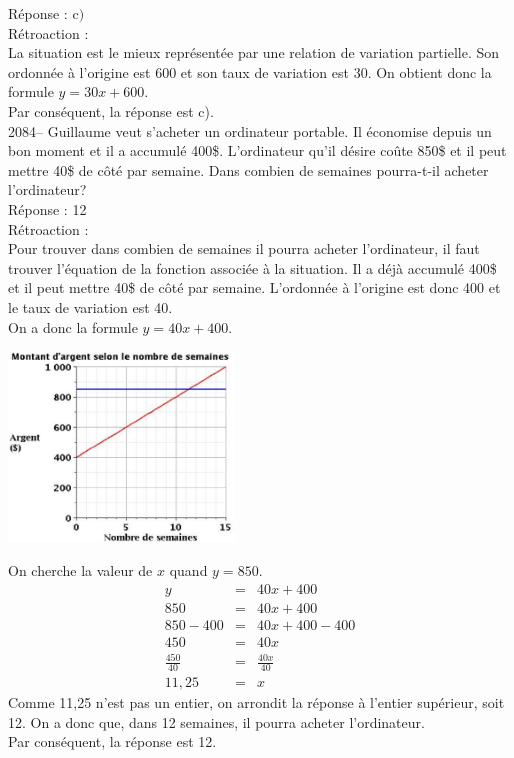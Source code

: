 \documentclass[letterpaper, 12pt]{article}
\begin{document}
R\'eponse : c$)$\\

R\'etroaction :\\
La situation est le mieux repr\'esent\'ee par une relation de variation partielle. Son ordonn\'ee \`a l'origine est 600 et son taux de variation est 30. On obtient donc la formule $y=30x + 600$.\\
Par cons\'equent, la r\'eponse est c).\\

2084-- Guillaume veut s'acheter un ordinateur portable. Il \'economise depuis un bon moment et il a accumul\'e 400\$. L'ordinateur qu'il d\'esire co\^ute 850\$ et il peut mettre 40\$ de c\^ot\'e par semaine. Dans combien de semaines pourra-t-il acheter l'ordinateur?\\

R\'eponse : 12\\

R\'etroaction :\\
Pour trouver dans combien de semaines il pourra acheter l'ordinateur, il faut trouver l'\'equation de la fonction associ\'ee \`a la situation. Il a d\'ej\`a accumul\'e 400\$ et il peut mettre 40\$ de c\^ot\'e par semaine. L'ordonn\'ee \`a l'origine est donc 400 et le taux de variation est 40.\\
On a donc la formule $y=40x + 400$.
\begin{center}
 \includegraphics[width=6cm,bb=14 14 481 415]{Q2084v.eps}
\end{center}
On cherche la valeur de $x$ quand $y=850$.
\begin{eqnarray*}
 y&=&40x + 400\\
850&=&40x + 400\\
850-400&=&40x + 400-400\\
450&=&40x\\[2mm]
\frac{450}{40}&=&\frac{40x}{40}\\[2mm]
11,25&=&x
\end{eqnarray*}
Comme 11,25 n'est pas un entier, on arrondit la r\'eponse \`a l'entier sup\'erieur, soit 12. On a donc que, dans 12 semaines, il pourra acheter l'ordinateur.\\
Par cons\'equent, la r\'eponse est 12.\\
\end{document}
